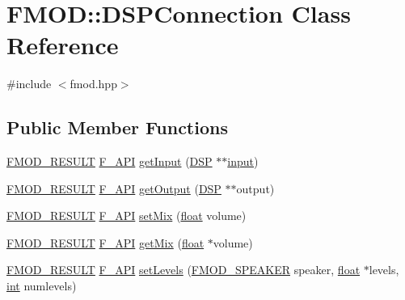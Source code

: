 \hypertarget{class_f_m_o_d_1_1_d_s_p_connection}{\section{F\-M\-O\-D\-:\-:D\-S\-P\-Connection Class Reference}
\label{class_f_m_o_d_1_1_d_s_p_connection}
}


{\ttfamily \#include $<$fmod.\-hpp$>$}

\subsection*{Public Member Functions}
\begin{DoxyCompactItemize}
\item 
\hyperlink{fmod_8h_ae6ddadf8cb315e93ae7e6456b19db276}{F\-M\-O\-D\-\_\-\-R\-E\-S\-U\-L\-T} \hyperlink{fmod_8h_ace803d13e798b0cdde4384f9f323b901}{F\-\_\-\-A\-P\-I} \hyperlink{class_f_m_o_d_1_1_d_s_p_connection_a4885524212e3f791debfac1ec259ee6a}{get\-Input} (\hyperlink{class_f_m_o_d_1_1_d_s_p}{D\-S\-P} $\ast$$\ast$\hyperlink{glew_8h_ad3c78daa7d8673f71649d4840c641779}{input})
\item 
\hyperlink{fmod_8h_ae6ddadf8cb315e93ae7e6456b19db276}{F\-M\-O\-D\-\_\-\-R\-E\-S\-U\-L\-T} \hyperlink{fmod_8h_ace803d13e798b0cdde4384f9f323b901}{F\-\_\-\-A\-P\-I} \hyperlink{class_f_m_o_d_1_1_d_s_p_connection_a813e7b67af3dcf1fad6b8ed73ad99a8d}{get\-Output} (\hyperlink{class_f_m_o_d_1_1_d_s_p}{D\-S\-P} $\ast$$\ast$output)
\item 
\hyperlink{fmod_8h_ae6ddadf8cb315e93ae7e6456b19db276}{F\-M\-O\-D\-\_\-\-R\-E\-S\-U\-L\-T} \hyperlink{fmod_8h_ace803d13e798b0cdde4384f9f323b901}{F\-\_\-\-A\-P\-I} \hyperlink{class_f_m_o_d_1_1_d_s_p_connection_a67b8373d3bead0903909ac035acfa47d}{set\-Mix} (\hyperlink{fmod_8h_aeb841aa4b4b5f444b5d739d865b420af}{float} volume)
\item 
\hyperlink{fmod_8h_ae6ddadf8cb315e93ae7e6456b19db276}{F\-M\-O\-D\-\_\-\-R\-E\-S\-U\-L\-T} \hyperlink{fmod_8h_ace803d13e798b0cdde4384f9f323b901}{F\-\_\-\-A\-P\-I} \hyperlink{class_f_m_o_d_1_1_d_s_p_connection_a21bceb2d4e9d4f951c137d7a2bc95572}{get\-Mix} (\hyperlink{fmod_8h_aeb841aa4b4b5f444b5d739d865b420af}{float} $\ast$volume)
\item 
\hyperlink{fmod_8h_ae6ddadf8cb315e93ae7e6456b19db276}{F\-M\-O\-D\-\_\-\-R\-E\-S\-U\-L\-T} \hyperlink{fmod_8h_ace803d13e798b0cdde4384f9f323b901}{F\-\_\-\-A\-P\-I} \hyperlink{class_f_m_o_d_1_1_d_s_p_connection_a4ff2362aa7cfb0b5397919ca97f27d60}{set\-Levels} (\hyperlink{fmod_8h_a1870cd80bd38e1ba43eaa81e74d63bdc}{F\-M\-O\-D\-\_\-\-S\-P\-E\-A\-K\-E\-R} speaker, \hyperlink{fmod_8h_aeb841aa4b4b5f444b5d739d865b420af}{float} $\ast$levels, \hyperlink{wglew_8h_a500a82aecba06f4550f6849b8099ca21}{int} numlevels)

\end{DoxyCompactItemize}
